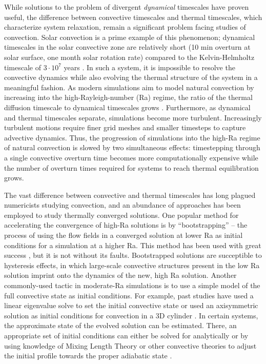 \documentclass[aps, pre, onecolumn, nofootinbib, notitlepage, groupedaddress, amsfonts, amssymb, amsmath, longbibliography]{revtex4-1}
\begin{document}
While solutions to the problem of divergent \emph{dynamical} timescales have proven useful,
the difference between convective timescales and thermal timescales, which
characterize system relaxation, remain a significant problem facing studies of convection. 
Solar convection is a prime example of this phenomenon;
dynamical timescales in the solar convective zone are relatively short 
(10 min overturn at solar surface, one month solar
rotation rate) compared to the Kelvin-Helmholtz timescale of
$3 \cdot 10^7$ years \cite{stix2003}.  
In such a system, it is impossible to resolve the convective dynamics while also
evolving the thermal structure of the system in a meaningful fashion.
As modern simulations aim to model natural convection
by increasing into the high-Rayleigh-number (Ra) regime,
the ratio of the thermal diffusion timescale to dynamical timescales
grows \cite{anders&brown2017}.
Furthermore, as dynamical and thermal timescales separate, 
simulations become more turbulent. Increasingly turbulent motions 
require finer grid meshes and smaller timesteps
to capture advective dynamics. Thus, the progression of simulations into the high-Ra
regime of natural convection is slowed by two simultaneous effects: timestepping
through a single convective overturn time becomes more computationally expensive
while the number of overturn times required for systems to reach thermal equilibration
grows.

The vast difference between convective and thermal timescales has long plagued
numericists studying convection, and an abundance of approaches has been employed to
study thermally converged solutions. One popular method for accelerating the convergence
of high-Ra solutions is by ``bootstrapping'' -- the process of using the flow
fields in a converged solution at lower Ra as initial conditions for a simulation at a higher
Ra.  This method has been used with great success \cite{johnston&doering2009, verzicco&camussi1997},
but it is not without its faults.  Bootstrapped solutions are succeptible to hysteresis
effects, in which large-scale convective structures present in the
low Ra solution imprint onto the dynamics of the new, high Ra solution. 
Another commonly-used tactic in
moderate-Ra simulations is to use 
a simple model of the full convective state as initial conditions.  
For example, past studies have used a linear eigenvalue solve to set the initial
convective state \cite{hurlburt&all1984} or used an axisymmetric solution 
as initial conditions for convection in a 3D cylinder \cite{verzicco&camussi1997}. 
In certain systems, 
the approximate state of the evolved solution can be estimated. There, an
appropriate set of initial conditions can either be solved for analytically
\cite{couston&all2017} or by using knowledge of Mixing Length Theory or other convective
theories to adjust the initial profile towards the proper adiabatic state \cite{brandenburg&all2005}.
\end{document}
